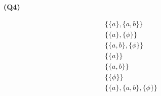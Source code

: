 \documentclass[12pt, a4paper]{article}
\newcommand{\bigset}[1]{\big \{ #1 \}}
\newcommand{\set}[1]{\{ #1 \}}
\begin{document}
\noindent\textbf{(Q4)}

\begin{gather*}
    \bigset{ \set{a}, \set{a,b} }\\
    \bigset{ \set{a}, \set{\phi} }\\
    \bigset{ \set{a,b}, \set{\phi} }\\
    \bigset{ \set{a}}\\
    \bigset{ \set{a,b}}\\
    \bigset{ \set{\phi}}\\
    \bigset{ \set{a}, \set{a,b}, \set{\phi}}
\end{gather*}
\end{document}
